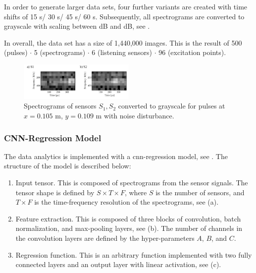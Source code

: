 In order to generate larger data sets, four further variants are created with time shifts of 15 \textmu s/ 30 \textmu s/ 45 \textmu s/ 60 \textmu s. Subsequently, all spectrograms are converted to grayscale with scaling between \unit[-100]{dB} and \unit[-40]{dB}, see .

In overall, the data set has a size of 1,440,000 images. This is the result of 500 (pulses) $\cdot$ 5 (spectrograms) $\cdot$ 6 (listening sensors) $\cdot$ 96 (excitation points).

\begin{figure}[t!]
	\centering
	\includegraphics[width=0.5\textwidth]{./chapters/cnn_accelerator/figures/histograms/spectrograms.pdf}
	\caption{Spectrograms of sensors $S_1, S_2$ converted to grayscale for pulses at $x =0.105$ m, $y = 0.109$ m with noise disturbance.}
	\label{fig:spectrograms}
\end{figure}

\subsubsection{CNN-Regression Model}
The data analytics is implemented with a \gls{cnn}-regression model, see . The structure of the model is described below:

\begin{enumerate}[label=\alph*)]
\item Input tensor. This is composed of spectrograms from the sensor signals. The tensor shape is defined by $S \times T \times F$, where $S$ is the number of sensors, and $T \times F$ is the time-frequency resolution of the spectrograms, see (a).

\item Feature extraction. This is composed of three blocks of convolution, batch normalization, and max-pooling layers, see (b). The number of channels in the convolution layers are defined by the hyper-parameters $A$, $B$, and $C$.

\item Regression function. This is an arbitrary function implemented with two fully connected layers and an output layer with linear activation, see (c).
\end{enumerate}


